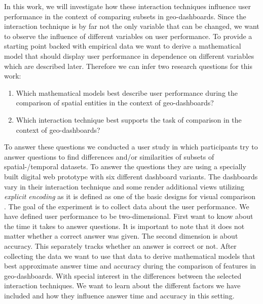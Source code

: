 In this work, we will investigate how these interaction techniques influence user performance in the context of comparing subsets in
geo-dashboards. Since the interaction technique is by far not the only variable that can be changed, we want to observe the influence
of different variables on user performance. To provide a starting point backed with empirical data we want to derive a mathematical model
that should display user performance in dependence on different variables which are described later. Therefore we can infer two research
questions for this work:
\begin{enumerate}
    \item Which mathematical models best describe user performance during the comparison of spatial entities
    in the context of geo-dashboards?
    \item Which interaction technique best supports the task of comparison in the context of
    geo-dashboards? 
\end{enumerate}

To answer these questions we conducted a user study in which participants try to answer questions to find differences and/or similarities
of subsets of spatial-/temporal datasets. To answer the questions they are using a specially built digital web prototype with six different
dashboard variants. The dashboards vary in their interaction technique and some render additional views utilizing \textit{explicit encoding}
as it is defined as one of the basic designs for visual comparison \citep*{Gleicher.2018}. The goal of the experiment is to collect data
about the user performance. We have defined user performance to be two-dimensional. First want to know about the time it takes to answer
questions. It is important to note that it does not matter whether a correct answer was given. The second dimension is about accuracy. This
separately tracks whether an answer is correct or not. After collecting the data we want to use that data to derive mathematical
models that best approximate answer time and accuracy during the comparison of features in
geo-dashboards. With special interest in the differences between the selected interaction
techniques. We want to learn about the different factors we have included and how they
influence answer time and accuracy in this setting.

